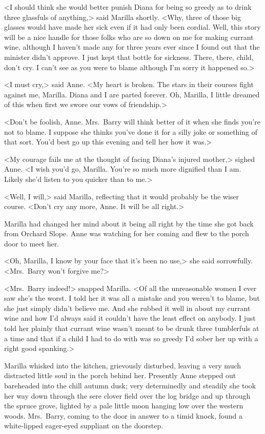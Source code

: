 <I should think she would better punish Diana for being so greedy as to drink three glassfuls of anything,> said Marilla shortly. <Why, three of those big glasses would have made her sick even if it had only been cordial. Well, this story will be a nice handle for those folks who are so down on me for making currant wine, although I haven't made any for three years ever since I found out that the minister didn't approve. I just kept that bottle for sickness. There, there, child, don't cry. I can't see as you were to blame although I'm sorry it happened so.>

<I must cry,> said Anne. <My heart is broken. The stars in their courses fight against me, Marilla. Diana and I are parted forever. Oh, Marilla, I little dreamed of this when first we swore our vows of friendship.>

<Don't be foolish, Anne. Mrs.~Barry will think better of it when she finds you're not to blame. I suppose she thinks you've done it for a silly joke or something of that sort. You'd best go up this evening and tell her how it was.>

<My courage fails me at the thought of facing Diana's injured mother,> sighed Anne. <I wish you'd go, Marilla. You're so much more dignified than I am. Likely she'd listen to you quicker than to me.>

<Well, I will,> said Marilla, reflecting that it would probably be the wiser course. <Don't cry any more, Anne. It will be all right.>

Marilla had changed her mind about it being all right by the time she got back from Orchard Slope. Anne was watching for her coming and flew to the porch door to meet her.

<Oh, Marilla, I know by your face that it's been no use,> she said sorrowfully. <Mrs.~Barry won't forgive me?>

<Mrs.~Barry indeed!> snapped Marilla. <Of all the unreasonable women I ever saw she's the worst. I told her it was all a mistake and you weren't to blame, but she just simply didn't believe me. And she rubbed it well in about my currant wine and how I'd always said it couldn't have the least effect on anybody. I just told her plainly that currant wine wasn't meant to be drunk three tumblerfuls at a time and that if a child I had to do with was so greedy I'd sober her up with a right good spanking.>

Marilla whisked into the kitchen, grievously disturbed, leaving a very much distracted little soul in the porch behind her. Presently Anne stepped out bareheaded into the chill autumn dusk; very determinedly and steadily she took her way down through the sere clover field over the log bridge and up through the spruce grove, lighted by a pale little moon hanging low over the western woods. Mrs.~Barry, coming to the door in answer to a timid knock, found a white-lipped eager-eyed suppliant on the doorstep.

